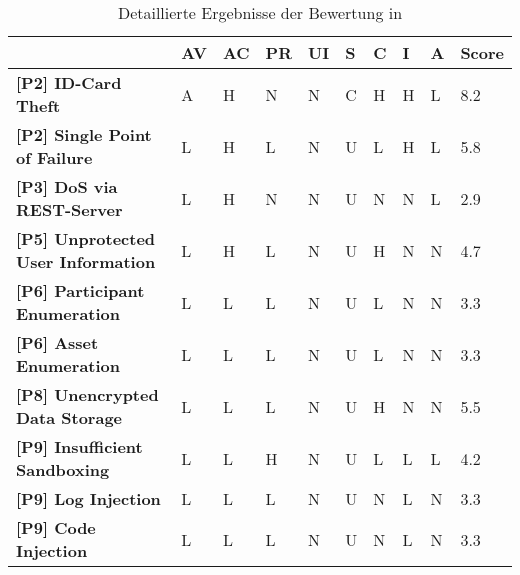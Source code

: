 \begin{sidewaystable}
\centering
\sffamily
\begin{tabularx}{\textwidth}{|l|X|X|X|X|X|X|X|X|l|}
\hline
\textbf{}                                      & \textbf{AV} & \textbf{AC} & \textbf{PR} & \textbf{UI} & \textbf{S} & \textbf{C} & \textbf{I} & \textbf{A} & \textbf{Score} \\ \hline
\textbf{{[}P2{]} ID-Card Theft}                & A           & H           & N           & N           & C          & H          & H          & L          & 8.2            \\ \hline
\textbf{{[}P2{]} Single Point of Failure}      & L           & H           & L           & N           & U          & L          & H          & L          & 5.8            \\ \hline
\textbf{{[}P3{]} DoS via REST-Server}          & L           & H           & N           & N           & U          & N          & N          & L          & 2.9            \\ \hline
\textbf{{[}P5{]} Unprotected User Information} & L           & H           & L           & N           & U          & H          & N          & N          & 4.7            \\ \hline
\textbf{{[}P6{]} Participant Enumeration}      & L           & L           & L           & N           & U          & L          & N          & N          & 3.3            \\ \hline
\textbf{{[}P6{]} Asset Enumeration}            & L           & L           & L           & N           & U          & L          & N          & N          & 3.3            \\ \hline
\textbf{{[}P8{]} Unencrypted Data Storage}     & L           & L           & L           & N           & U          & H          & N          & N          & 5.5            \\ \hline
\textbf{{[}P9{]} Insufficient Sandboxing}      & L           & L           & H           & N           & U          & L          & L          & L          & 4.2            \\ \hline
\textbf{{[}P9{]} Log Injection}                & L           & L           & L           & N           & U          & N          & L          & N          & 3.3            \\ \hline
\textbf{{[}P9{]} Code Injection}               & L           & L           & L           & N           & U          & N          & L          & N          & 3.3            \\ \hline
\end{tabularx}
\caption{Detaillierte Ergebnisse der Bewertung in }
\label{tab:eval_cvss_long}
\end{sidewaystable}


\newpage
